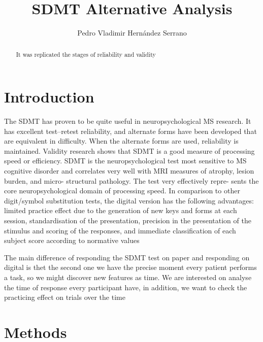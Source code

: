 \documentclass[letterpaper, 10 pt, conference]{ieeeconf}
\title{\LARGE \bf
SDMT Alternative Analysis
}
\author{Pedro Vladimir Hern\'andez Serrano}
\begin{document}
\maketitle
\thispagestyle{empty}
\pagestyle{empty}


\begin{abstract}

It was replicated the stages of reliability and validity

\end{abstract}

\section{Introduction}
\vspace{2mm}
The SDMT has proven to be quite useful in neuropsychological MS research. It has excellent test–retest reliability, and alternate forms have been developed that are equivalent in difficulty. When the alternate forms are used, reliability is maintained. Validity research shows that SDMT is a good measure of processing speed or efficiency. SDMT is the neuropsychological test most sensitive to MS cognitive disorder and correlates very well with MRI measures of atrophy, lesion burden, and micro- structural pathology. The test very effectively repre- sents the core neuropsychological domain of processing speed.
In comparison to other digit/symbol substitution tests, the digital version has the following advantages: limited practice effect due to the generation of new keys and forms at each session, standardisation of the presentation, precision in the presentation of the stimulus and scoring of the responses, and immediate classification of each subject score according to normative values

The main difference of responding the SDMT test on paper and responding on digital is thet the second one we have the precise moment every patient performs a task, so we might discover new features as time.
We are interested on analyse the time of response every participant have, in addition, we want to check the practicing effect on trials over the time

\section{Methods}
\vspace{2mm}
\end{document}
